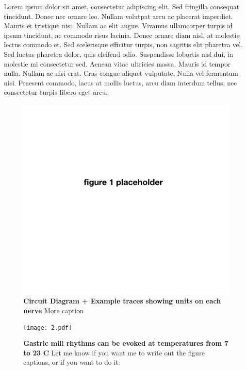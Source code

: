 \documentclass[9pt,lineno]{elife}
\begin{document}
Lorem ipsum dolor sit amet, consectetur adipiscing elit. Sed fringilla consequat tincidunt. Donec nec ornare leo. Nullam volutpat arcu ac placerat imperdiet. Mauris et tristique nisi. Nullam ac elit augue. Vivamus ullamcorper turpis id ipsum tincidunt, ac commodo risus lacinia. Donec ornare diam nisl, at molestie lectus commodo et. Sed scelerisque efficitur turpis, non sagittis elit pharetra vel. Sed luctus pharetra dolor, quis eleifend odio. Suspendisse lobortis nisl dui, in molestie mi consectetur sed. Aenean vitae ultricies massa. Mauris id tempor nulla. Nullam ac nisi erat. Cras congue aliquet vulputate. Nulla vel fermentum nisi. Praesent commodo, lacus at mollis luctus, arcu diam interdum tellus, nec consectetur turpis libero eget arcu.

\begin{figure}
\includegraphics[width=\linewidth]{1.png}
\caption{\textbf{Circuit Diagram + Example traces showing units on each nerve} More caption } 
\label{fig:1}
\end{figure}


\begin{figure}
\begin{fullwidth}
\texttt{[image: 2.pdf]}

\caption{\textbf{Gastric mill rhythms can be evoked at temperatures from 7 to 23 C } Let me know if you want me to write out the figure captions, or if you want to do it.   } 
\label{fig:1}
\end{fullwidth}
\end{figure}
\end{document}
